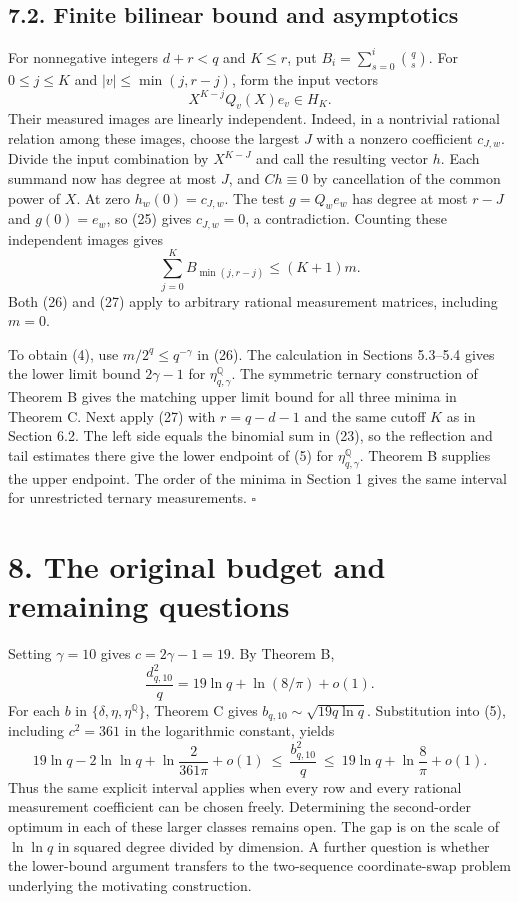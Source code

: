 \documentclass[
  10pt,
]{article}
\begin{document}
\subsection{7.2. Finite bilinear bound and asymptotics}

For nonnegative integers \(d+r<q\) and \(K\le r\), put \(B_i=\sum_{s=0}^i\binom qs\).
For \(0\le j\le K\) and \(|v|\le\min(j,r-j)\), form the input vectors
\[
 X^{K-j} Q_v(X)e_v\in H_K.
\]
Their measured images are linearly independent. Indeed, in a nontrivial rational relation among these images, choose the largest \(J\) with a nonzero coefficient \(c_{J,w}\). Divide the input combination by \(X^{K-J}\) and call the resulting vector \(h\). Each summand now has degree at most \(J\), and \(Ch\equiv0\) by cancellation of the common power of \(X\). At zero \(h_w(0)=c_{J,w}\). The test \(g=Q_w e_w\) has degree at most \(r-J\) and \(g(0)=e_w\), so (25) gives \(c_{J,w}=0\), a contradiction. Counting these independent images gives
\[
 \sum_{j=0}^K B_{\min(j,r-j)}\le(K+1)m. \tag{27}
\]
Both (26) and (27) apply to arbitrary rational measurement matrices, including \(m=0\).

To obtain (4), use \(m/2^q\le q^{-\gamma}\) in (26). The calculation in Sections 5.3--5.4 gives the lower limit bound \(2\gamma-1\) for \(\eta^{\mathbb Q}_{q,\gamma}\). The symmetric ternary construction of Theorem B gives the matching upper limit bound for all three minima in Theorem C. Next apply (27) with \(r=q-d-1\) and the same cutoff \(K\) as in Section 6.2. The left side equals the binomial sum in (23), so the reflection and tail estimates there give the lower endpoint of (5) for \(\eta^{\mathbb Q}_{q,\gamma}\). Theorem B supplies the upper endpoint. The order of the minima in Section 1 gives the same interval for unrestricted ternary measurements. \(\square\)

\section{8. The original budget and remaining questions}
Setting \(\gamma=10\) gives \(c=2\gamma-1=19\). By Theorem B,
\[
 \frac{d_{q,10}^2}{q}=19\ln q+\ln(8/\pi)+o(1).
\]
For each \(b\) in \(\{\delta,\eta,\eta^{\mathbb Q}\}\), Theorem C gives
\(b_{q,10}\sim\sqrt{19q\ln q}\). Substitution into (5), including
\(c^2=361\) in the logarithmic constant, yields
\[
 19\ln q-2\ln\ln q+\ln\frac{2}{361\pi}+o(1)
 \ \le\ \frac{b_{q,10}^2}{q}
 \ \le\ 19\ln q+\ln\frac8\pi+o(1).
\]
Thus the same explicit interval applies when every row and every rational
measurement coefficient can be chosen freely. Determining the second-order
optimum in each of these larger classes remains open. The gap is on the
scale of \(\ln\ln q\) in squared degree divided by dimension. A further
question is whether the lower-bound argument transfers to the two-sequence
coordinate-swap problem underlying the motivating construction.
\end{document}
